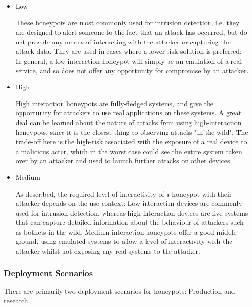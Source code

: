 \begin{itemize}
	\item Low
	
	These honeypots are most commonly used for intrusion detection, i.e. they are designed to alert someone to the fact that an attack has occurred, but do not provide any means of interacting with the attacker or capturing the attack data. They are used in cases where a lower-risk solution is preferred: In general, a low-interaction honeypot will simply be an emulation of a real service, and so does not offer any opportunity for compromise by an attacker.
	
	\item High
	
	High interaction honeypots are fully-fledged systems, and give the opportunity for attackers to use real applications on these systems. A great deal can be learned about the nature of attacks from using high-interaction honeypots, since it is the closest thing to observing attacks "in the wild". The trade-off here is the high-risk associated with the exposure of a real device to a malicious actor, which in the worst case could see the entire system taken over by an attacker and used to launch further attacks on other devices.
	
	\item Medium
	
	As described, the required level of interactivity of a honeypot with their attacker depends on the use context: Low-interaction devices are commonly used for intrusion detection, whereas high-interaction devices are live systems that can capture detailed information about the behaviour of attackers such as botnets in the wild. Medium interaction honeypots offer a good middle-ground, using emulated systems to allow a level of interactivity with the attacker whilst not exposing any real systems to the attacker. 
	
	
\end{itemize}



\subsubsection{Deployment Scenarios}
There are primarily two deployment scenarios for honeypots: Production and research.

